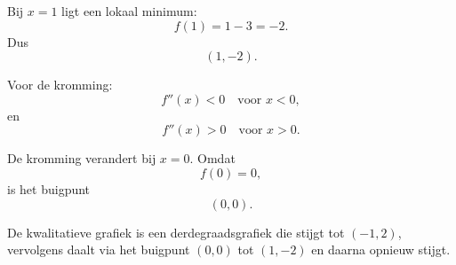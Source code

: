 \documentclass{ximera}
\begin{document}
\begin{oefening}{\oefB\ESS}
\begin{oplossing}
Bij $x=1$ ligt een lokaal minimum:
\[
f(1)=1-3=-2.
\]
Dus
\[
\boxed{(1,-2)}.
\]

Voor de kromming:
\[
f''(x)<0 \quad \text{voor }x<0,
\]
en
\[
f''(x)>0 \quad \text{voor }x>0.
\]

De kromming verandert bij $x=0$. Omdat
\[
f(0)=0,
\]
is het buigpunt
\[
\boxed{(0,0)}.
\]

De kwalitatieve grafiek is een derdegraadsgrafiek die stijgt tot
$(-1,2)$, vervolgens daalt via het buigpunt $(0,0)$ tot $(1,-2)$ en daarna
opnieuw stijgt.

\end{oplossing}

\end{oefening}






\end{document}
